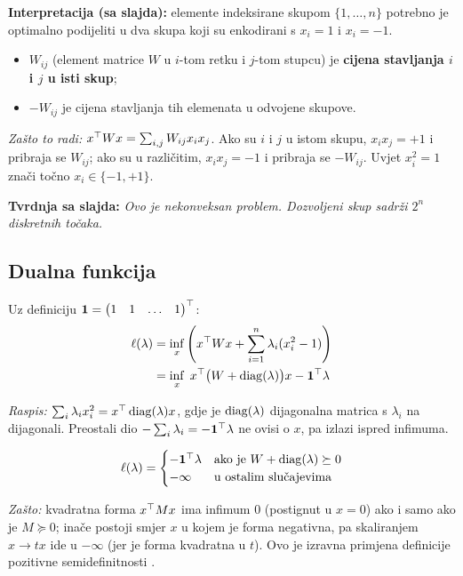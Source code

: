 \textbf{Interpretacija (sa slajda):} elemente indeksirane skupom
$\{1,\dots,n\}$ potrebno je optimalno podijeliti u dva skupa koji su
enkodirani s $x_i = 1$ i $x_i = -1$.

\begin{itemize}
  \item $W_{ij}$ (element matrice $W$ u $i$-tom retku i $j$-tom stupcu) je
        \textbf{cijena stavljanja $i$ i $j$ u isti skup};
  \item $-W_{ij}$ je cijena stavljanja tih elemenata u odvojene skupove.
\end{itemize}

\emph{Zašto to radi:} $x^{\top} Wx = \sum_{i,j} W_{ij}x_ix_j$. Ako su $i$ i $j$ u
istom skupu, $x_ix_j = +1$ i pribraja se $W_{ij}$; ako su u različitim,
$x_ix_j = -1$ i pribraja se $-W_{ij}$. Uvjet $x_i^2 = 1$ znači točno
$x_i \in \{-1, +1\}$.

\textbf{Tvrdnja sa slajda:} \emph{Ovo je nekonveksan problem. Dozvoljeni skup
sadrži $2^n$ diskretnih točaka.}

\subsection{Dualna funkcija}

Uz definiciju $\mathbf{1} = \begin{pmatrix}1&1&\dots&1\end{pmatrix}^{\top}$:
\begin{align}
\ell(\lambda)
&= \inf_x\left(x^{\top} Wx + \sum_{i=1}^{n}\lambda_i(x_i^2 - 1)\right) \\
&= \inf_x\; x^{\top}\big(W + \operatorname{diag}(\lambda)\big)x - \mathbf{1}^{\top}\lambda
\end{align}

\emph{Raspis:} $\sum_i \lambda_i x_i^2 = x^{\top}\operatorname{diag}(\lambda)x$, gdje je
$\operatorname{diag}(\lambda)$ dijagonalna matrica s $\lambda_i$ na dijagonali. Preostali dio
$-\sum_i\lambda_i = -\mathbf{1}^{\top}\lambda$ ne ovisi o $x$, pa izlazi ispred
infimuma. \checkmark

\begin{equation}
\ell(\lambda) =
\begin{cases}
-\mathbf{1}^{\top}\lambda & \text{ako je } W + \operatorname{diag}(\lambda) \succeq 0 \\
-\infty & \text{u ostalim slučajevima}
\end{cases}
\end{equation}

\emph{Zašto:} kvadratna forma $x^{\top} Mx$ ima infimum $0$ (postignut u $x = 0$)
ako i samo ako je $M \succeq 0$; inače postoji smjer $x$ u kojem je forma
negativna, pa skaliranjem $x \to tx$ ide u $-\infty$ (jer je forma kvadratna u
$t$). Ovo je izravna primjena definicije pozitivne semidefinitnosti
.


